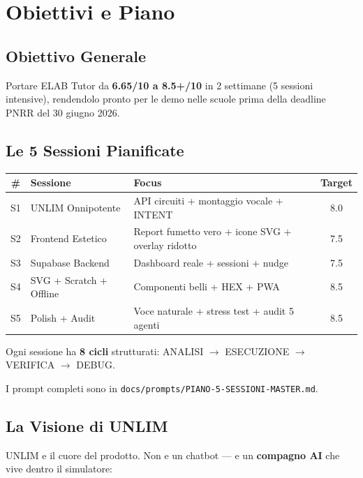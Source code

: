 \documentclass[11pt,a4paper]{article}
\begin{document}
\section{Obiettivi e Piano}

\subsection{Obiettivo Generale}

Portare ELAB Tutor da \textbf{6.65/10 a 8.5+/10} in 2 settimane (5 sessioni intensive), rendendolo pronto per le demo nelle scuole prima della deadline PNRR del 30 giugno 2026.

\subsection{Le 5 Sessioni Pianificate}

\begin{tabularx}{\textwidth}{clXc}
\toprule
\textbf{\#} & \textbf{Sessione} & \textbf{Focus} & \textbf{Target} \\
\midrule
S1 & UNLIM Onnipotente & API circuiti + montaggio vocale + INTENT & 8.0 \\
S2 & Frontend Estetico & Report fumetto vero + icone SVG + overlay ridotto & 7.5 \\
S3 & Supabase Backend & Dashboard reale + sessioni + nudge & 7.5 \\
S4 & SVG + Scratch + Offline & Componenti belli + HEX + PWA & 8.5 \\
S5 & Polish + Audit & Voce naturale + stress test + audit 5 agenti & 8.5 \\
\bottomrule
\end{tabularx}

Ogni sessione ha \textbf{8 cicli} strutturati: ANALISI $\rightarrow$ ESECUZIONE $\rightarrow$ VERIFICA $\rightarrow$ DEBUG.

I prompt completi sono in \texttt{docs/prompts/PIANO-5-SESSIONI-MASTER.md}.

\subsection{La Visione di UNLIM}

UNLIM e il cuore del prodotto. Non e un chatbot --- e un \textbf{compagno AI} che vive dentro il simulatore:
\end{document}
